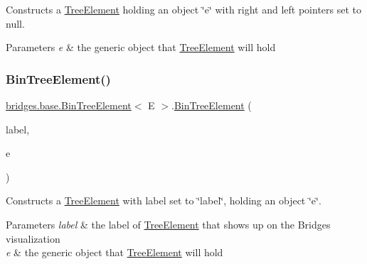Constructs a \hyperlink{classbridges_1_1base_1_1_tree_element}{Tree\+Element} holding an object \char`\"{}e\char`\"{} with right and left pointers set to null.


\begin{DoxyParams}{Parameters}
{\em e} & the generic object that \hyperlink{classbridges_1_1base_1_1_tree_element}{Tree\+Element} will hold \\
\hline
\end{DoxyParams}
\mbox{\label{classbridges_1_1base_1_1_bin_tree_element_aac0e300f53d5c1c89b747a1f2c5d54c9}} 
\subsubsection{\texorpdfstring{Bin\+Tree\+Element()}{BinTreeElement()}\hspace{0.1cm}{\footnotesize\ttfamily [3/5]}}
{\footnotesize\ttfamily \hyperlink{classbridges_1_1base_1_1_bin_tree_element}{bridges.\+base.\+Bin\+Tree\+Element}$<$ E $>$.\hyperlink{classbridges_1_1base_1_1_bin_tree_element}{Bin\+Tree\+Element} (\begin{DoxyParamCaption}\item[{String}]{label,  }\item[{E}]{e }\end{DoxyParamCaption})}

Constructs a \hyperlink{classbridges_1_1base_1_1_tree_element}{Tree\+Element} with label set to \char`\"{}label\char`\"{}, holding an object \char`\"{}e\char`\"{}.


\begin{DoxyParams}{Parameters}
{\em label} & the label of \hyperlink{classbridges_1_1base_1_1_tree_element}{Tree\+Element} that shows up on the Bridges visualization\\
\hline
{\em e} & the generic object that \hyperlink{classbridges_1_1base_1_1_tree_element}{Tree\+Element} will hold \\
\hline
\end{DoxyParams}
\mbox{\label{classbridges_1_1base_1_1_bin_tree_element_ab402fac72353087b1b93e82db007e1d7}} 

